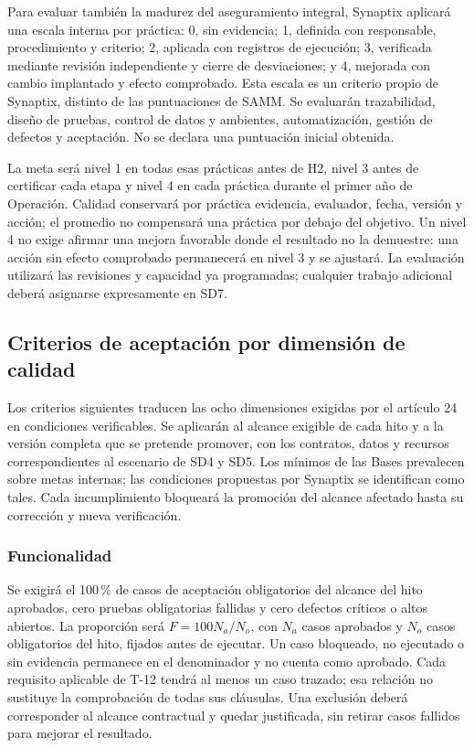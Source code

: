 Para evaluar también la madurez del aseguramiento integral, Synaptix aplicará una escala interna por práctica: 0, sin evidencia; 1, definida con responsable, procedimiento y criterio; 2, aplicada con registros de ejecución; 3, verificada mediante revisión independiente y cierre de desviaciones; y 4, mejorada con cambio implantado y efecto comprobado. Esta escala es un criterio propio de Synaptix, distinto de las puntuaciones de SAMM. Se evaluarán trazabilidad, diseño de pruebas, control de datos y ambientes, automatización, gestión de defectos y aceptación. No se declara una puntuación inicial obtenida.

La meta será nivel 1 en todas esas prácticas antes de H2, nivel 3 antes de certificar cada etapa y nivel 4 en cada práctica durante el primer año de Operación. Calidad conservará por práctica evidencia, evaluador, fecha, versión y acción; el promedio no compensará una práctica por debajo del objetivo. Un nivel 4 no exige afirmar una mejora favorable donde el resultado no la demuestre: una acción sin efecto comprobado permanecerá en nivel 3 y se ajustará. La evaluación utilizará las revisiones y capacidad ya programadas; cualquier trabajo adicional deberá asignarse expresamente en SD7.

\subsection{Criterios de aceptación por dimensión de calidad}
Los criterios siguientes traducen las ocho dimensiones exigidas por el artículo 24 en condiciones verificables. Se aplicarán al alcance exigible de cada hito y a la versión completa que se pretende promover, con los contratos, datos y recursos correspondientes al escenario de SD4 y SD5. Los mínimos de las Bases prevalecen sobre metas internas; las condiciones propuestas por Synaptix se identifican como tales. Cada incumplimiento bloqueará la promoción del alcance afectado hasta su corrección y nueva verificación. \parencite[art.~24, p.~17]{sd9-ba}

\subsubsection{Funcionalidad}
Se exigirá el 100\,\% de casos de aceptación obligatorios del alcance del hito aprobados, cero pruebas obligatorias fallidas y cero defectos críticos o altos abiertos. La proporción será $F=100N_a/N_o$, con $N_a$ casos aprobados y $N_o$ casos obligatorios del hito, fijados antes de ejecutar. Un caso bloqueado, no ejecutado o sin evidencia permanece en el denominador y no cuenta como aprobado. Cada requisito aplicable de T-12 tendrá al menos un caso trazado; esa relación no sustituye la comprobación de todas sus cláusulas. Una exclusión deberá corresponder al alcance contractual y quedar justificada, sin retirar casos fallidos para mejorar el resultado. \parencite[20.1 y RT-20.08, pp.~34--35]{sd9-bt}


